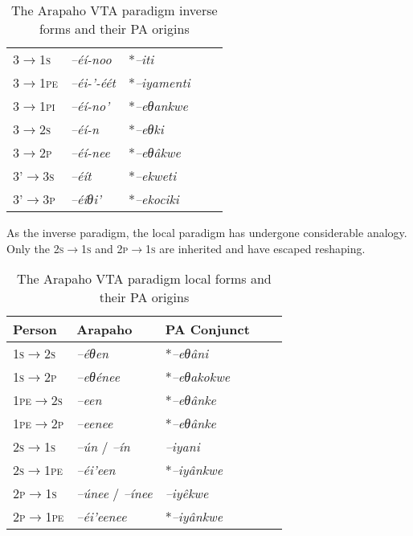 \documentclass[twoside,a4paper,11pt]{article}
\newcommand{\ipa}[1]{{\phon\textit{#1}}}
\newcommand{\grise}[1]{\cellcolor{lightgray}\textbf{#1}}
\newcommand{\Σ}{\greek{Σ}}
\begin{document}
\begin{table}[H]
\caption{The Arapaho VTA paradigm inverse forms and their PA origins}
\centering \label{tab:arapaho.vta.2}
\begin{tabular}{lllll}
\toprule
\textsc{3$\rightarrow$1s} & 	\ipa{--éí-noo} & 	\grise{}*\ipa{--iti} & 		\\
\textsc{3$\rightarrow$1pe} & 	\ipa{--éi-'-éét} & \grise{}*\ipa{--iyamenti} & 		\\
\textsc{3$\rightarrow$1pi} & 	\ipa{--éí-no'} & 	\grise{}*\ipa{--eθankwe} & 		\\
\midrule
\textsc{3$\rightarrow$2s} & 	\ipa{--éí-n} & \grise{}*\ipa{--eθki} & 		\\
\textsc{3$\rightarrow$2p} & 	\ipa{--éí-nee} & \grise{}*\ipa{--eθâkwe} & 		\\
\midrule
3'\textsc{$\rightarrow$3s} & 	\ipa{--éít} & 	*\ipa{--ekweti} & 		\\
3'\textsc{$\rightarrow$3p} & 	\ipa{--éíθi'} & 	*\ipa{--ekociki} & 		\\
\bottomrule
\end{tabular}
\end{table}

As the inverse paradigm, the local paradigm has undergone considerable analogy. Only the \textsc{2s$\rightarrow$1s} and \textsc{2p$\rightarrow$1s} are inherited and have escaped reshaping. 



\begin{table}[H]
\caption{The Arapaho VTA paradigm local forms and their PA origins}
\centering \label{tab:vta.3}
\begin{tabular}{lllll}
\toprule
Person & Arapaho & PA Conjunct    \\
\midrule 
\textsc{1s$\rightarrow$2s}& \ipa{--éθen} & \grise{}*\ipa{--eθâni}   \\
\textsc{1s$\rightarrow$2p}&\ipa{--eθénee} & \grise{}*\ipa{--eθakokwe} & \\
\textsc{1pe$\rightarrow$2s}&\ipa{--een} & \grise{}*\ipa{--eθânke} &   \\
\textsc{1pe$\rightarrow$2p}&\ipa{--eenee} & \grise{}*\ipa{--eθânke} &   \\
\midrule 
\textsc{2s$\rightarrow$1s}&\ipa{--ún} / \ipa{--ín} &   \ipa{--iyani}     \\
\textsc{2s$\rightarrow$1pe}& \ipa{--éi'een}& \grise{}*\ipa{--iyânkwe} &  \\
\textsc{2p$\rightarrow$1s}&\ipa{--únee} / \ipa{--ínee} &  \ipa{--iyêkwe} &   \\
\textsc{2p$\rightarrow$1pe}&\ipa{--éi'eenee} & \grise{}*\ipa{--iyânkwe} &   \\
\bottomrule
\end{tabular}
\end{table}
\end{document}
